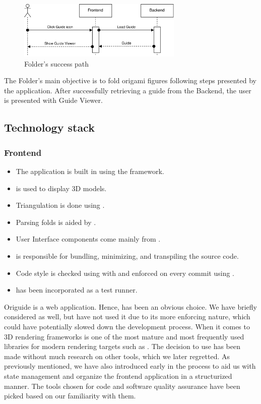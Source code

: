\begin{figure}[H]
	\caption{Folder's success path}
  \centering
    \includegraphics[width=0.70\textwidth]{assets/3-folder-flow.png}
\end{figure}

The Folder's main objective is to fold origami figures following steps presented by the application. After successfully retrieving a guide from the Backend, the user is presented with Guide Viewer.

\subsection{Technology stack}

\subsubsection{Frontend}

\begin{itemize}
	\item The application is built in  using the  framework. 
	\item {} is used to display 3D models.
	\item Triangulation is done using . 
	\item Parsing folds is aided by .
	\item User Interface components come mainly from .
	\item {} is responsible for bundling, minimizing, and transpiling the source code.
	\item Code style is checked using  with  and enforced on every commit using .
	\item {} has been incorporated as a test runner.
\end{itemize}

Origuide is a web application. Hence,  has been an obvious choice. We have briefly considered  as well, but have not used it due to its more enforcing nature, which could have potentially slowed down the development process. When it comes to 3D rendering frameworks  is one of the most mature and most frequently used libraries for modern rendering targets such as . The decision to use  has been made without much research on other tools, which we later regretted. As previously mentioned, we have also introduced  early in the process to aid us with state management and organize the frontend application in a structurized manner. The tools chosen for code and software quality assurance have been picked based on our familiarity with them.


